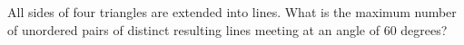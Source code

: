 All sides of four triangles are extended into lines. What is the maximum number of unordered pairs of distinct resulting lines meeting at an angle of 60 degrees?
